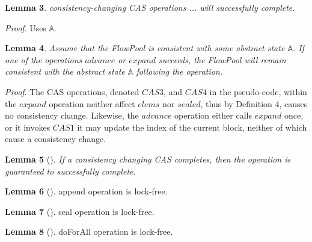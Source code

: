 \documentclass[runningheads,a4paper]{llncs}
\begin{document}
\textbf{Lemma 3}. \textit{consistency-changing CAS operations ... will successfully complete}.

\textit{Proof}. Uses $\mathbb{A}$.

\textbf{Lemma 4}. \textit{Assume that the FlowPool is consistent with some abstract state $\mathbb{A}$. If one of the operations $advance$ or $expand$ succeeds, the FlowPool will remain consistent with the abstract state $\mathbb{A}$ following the operation.}

\textit{Proof}. The CAS operations, denoted $CAS3$, and $CAS4$ in the pseudo-code,  within the $expand$ operation neither affect $elems$ nor $sealed$, thus by Definition 4, causes no consistency change. Likewise, the $advance$ operation either calls $expand$ once, or it invokes $CAS1$ it may update the index of the current block, neither of which cause a consistency change.

\textbf{Lemma 5} (). \textit{If a consistency changing CAS completes, then the operation is guaranteed to successfully complete}.

\textbf{Lemma 6} (). append operation is lock-free.

\textbf{Lemma 7} (). seal operation is lock-free.

\textbf{Lemma 8} (). doForAll operation is lock-free.



\end{document}
